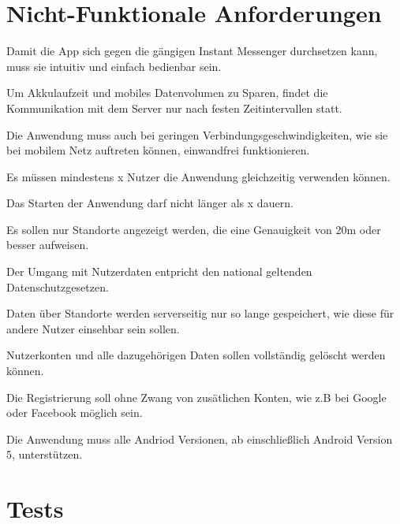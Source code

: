 \documentclass[parskip=full,11pt]{scrartcl}
\begin{document}
\section{Nicht-Funktionale Anforderungen}

Damit die App sich gegen die gängigen Instant Messenger durchsetzen kann, muss sie intuitiv und einfach bedienbar sein.

Um Akkulaufzeit und mobiles Datenvolumen zu Sparen, findet die Kommunikation mit dem Server nur nach festen Zeitintervallen statt.

Die Anwendung muss auch bei geringen Verbindungsgeschwindigkeiten, wie sie bei mobilem Netz auftreten können, einwandfrei funktionieren.

Es müssen mindestens x Nutzer die Anwendung gleichzeitig verwenden können.  %

Das Starten der Anwendung darf nicht länger als x dauern.   %

Es sollen nur Standorte angezeigt werden, die eine Genauigkeit von 20m oder besser aufweisen.

Der Umgang mit Nutzerdaten entpricht den national geltenden Datenschutzgesetzen.

Daten über Standorte werden serverseitig nur so lange gespeichert, wie diese für andere Nutzer einsehbar sein sollen.

Nutzerkonten und alle dazugehörigen Daten sollen vollständig gelöscht werden können.

Die Registrierung soll ohne Zwang von zusätlichen Konten, wie z.B bei Google oder Facebook möglich sein.

Die Anwendung muss alle Andriod Versionen, ab einschließlich Android Version 5, unterstützen.



\section{Tests}
\end{document}
